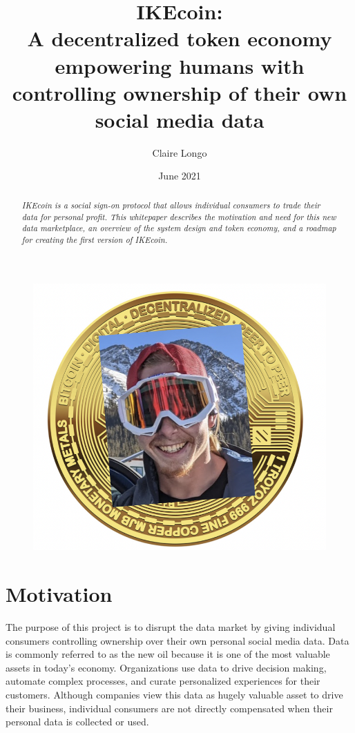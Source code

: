 \documentclass[12pt, letterpaper, twoside]{article}
\title{\color{cyan}IKEcoin: \\ 
\large A decentralized token economy empowering humans with controlling ownership of their own social media data}
\author{Claire Longo}
\date{June 2021}
\begin{document}
\maketitle

\begin{figure}[h]
  \includegraphics[scale=0.3]{media/IKEcoin.jpg}
  \centering
\end{figure}

\begin{abstract}
\textit{IKEcoin is a social sign-on protocol that allows individual consumers to trade their data for personal profit. This whitepaper describes the motivation and need for this new data marketplace, an overview of the system design and token economy, and a roadmap for creating the first version of IKEcoin. }
\end{abstract}
 \pagebreak

\section{Motivation}
The purpose of this project is to disrupt the data market by giving individual consumers controlling ownership over their own personal social media data. Data is commonly referred to as the new oil because it is one of the most valuable assets in today's economy. Organizations use data to drive decision making, automate complex processes, and curate personalized experiences for their customers. Although companies view this data as hugely valuable asset to drive their business, individual consumers are not directly compensated when their personal data is collected or used. \\
\end{document}
